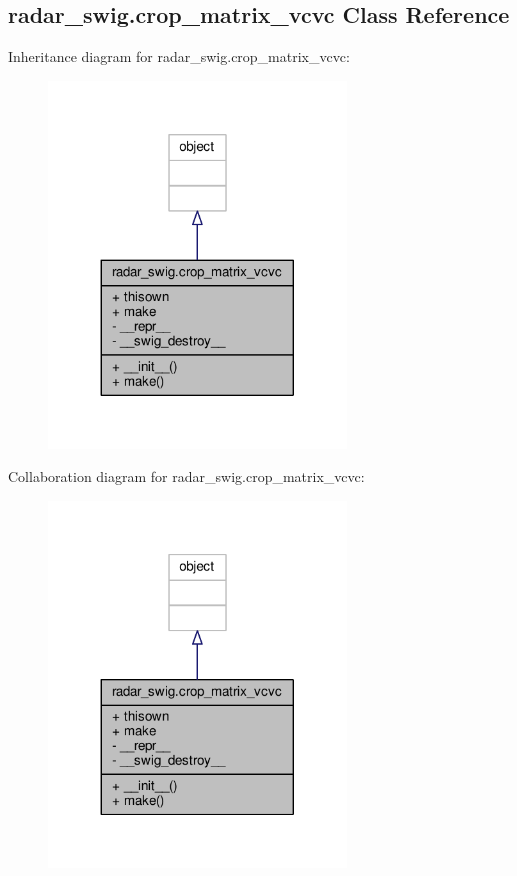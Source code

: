 \subsection{radar\+\_\+swig.\+crop\+\_\+matrix\+\_\+vcvc Class Reference}
\label{classradar__swig_1_1crop__matrix__vcvc}


Inheritance diagram for radar\+\_\+swig.\+crop\+\_\+matrix\+\_\+vcvc\+:
\nopagebreak
\begin{figure}[H]
\begin{center}
\leavevmode
\includegraphics[width=224pt]{d9/d18/classradar__swig_1_1crop__matrix__vcvc__inherit__graph}
\end{center}
\end{figure}


Collaboration diagram for radar\+\_\+swig.\+crop\+\_\+matrix\+\_\+vcvc\+:
\nopagebreak
\begin{figure}[H]
\begin{center}
\leavevmode
\includegraphics[width=224pt]{d8/d43/classradar__swig_1_1crop__matrix__vcvc__coll__graph}
\end{center}
\end{figure}

